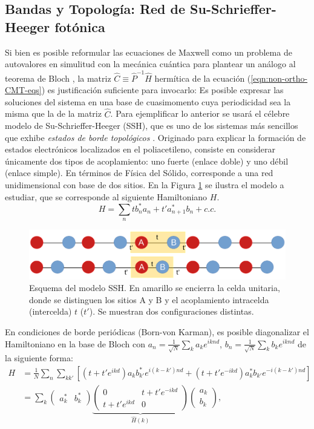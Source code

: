 \subsection{Bandas y Topología: Red de Su-Schrieffer-Heeger fotónica}
Si bien es posible reformular las ecuaciones de Maxwell como un problema de autovalores en simulitud con la mecánica cuántica para plantear un análogo al teorema de Bloch \cite{joannopoulos_photonic_2008}, la matriz $\hat{C}\equiv\hat{P}^{-1}\hat{H}$ hermítica de la ecuación (\ref{eqn:non-ortho-CMT-eqs}) es justificación suficiente para invocarlo: Es posible expresar las soluciones del sistema en una base de cuasimomento cuya periodicidad sea la misma que la de la matriz $\hat{C}$.
Para ejemplificar lo anterior se usará el célebre modelo de Su-Schrieffer-Heeger (SSH), que es uno de los sistemas más sencillos que exhibe \textit{estados de borde topológicos} \cite{ssh, ssh-photonic, topological-photonics}. Originado para explicar la formación de estados electrónicos localizados en el poliacetileno, consiste en considerar únicamente dos tipos de acoplamiento: uno fuerte (enlace doble) y uno débil (enlace simple). En términos de Física del Sólido, corresponde a una red unidimensional con base de dos sitios. En la Figura \ref{fig:ssh-model} se ilustra el modelo a estudiar, que se corresponde al siguiente Hamiltoniano $H$. 
\begin{equation*}
	H = \sum_n t b_n^*a_n + t'  a_{n+1}^*b_n  + c.c.
\end{equation*}
\begin{figure}[h]
\centering
	\includegraphics[width=\linewidth]{media/ssh-model.png}
	\caption[Esquema del modelo SSH.]{Esquema del modelo SSH. En amarillo se encierra la celda unitaria, donde se distinguen los sitios A y B y el acoplamiento intracelda (intercelda) $t$ ($t'$). Se muestran dos configuraciones distintas. \label{fig:ssh-model}}
\end{figure}
En condiciones de borde periódicas (Born-von Karman), es posible diagonalizar el Hamiltoniano en la base de Bloch con $a_n = \frac{1}{\sqrt{N}}\sum_k a_k e^{iknd}$, $b_n = \frac{1}{\sqrt{N}}\sum_k b_k e^{iknd}$ de la siguiente forma:
\begin{align*}
	H &= \frac{1}{N}\sum_n \sum_{k k'} \left[\left(t + t' e^{ikd}\right) a_k b_{k'}^* e^{i(k-k')nd}  + \left(t  + t' e^{-ikd}\right) a_k^* b_{k'} e^{-i(k-k')nd} \right]
	\\
	&=  \sum_k 
	\begin{pmatrix}
		a_k^* & b_k^*		
	\end{pmatrix}
	\underbrace{
	\begin{pmatrix}
		0 & t+ t'e^{-ikd}
		\\
		t+ t'e^{ikd} & 0
	\end{pmatrix}}_{\hat{H}(k)}
	\begin{pmatrix}
		a_k
		\\
		b_k		
	\end{pmatrix},
\end{align*}
